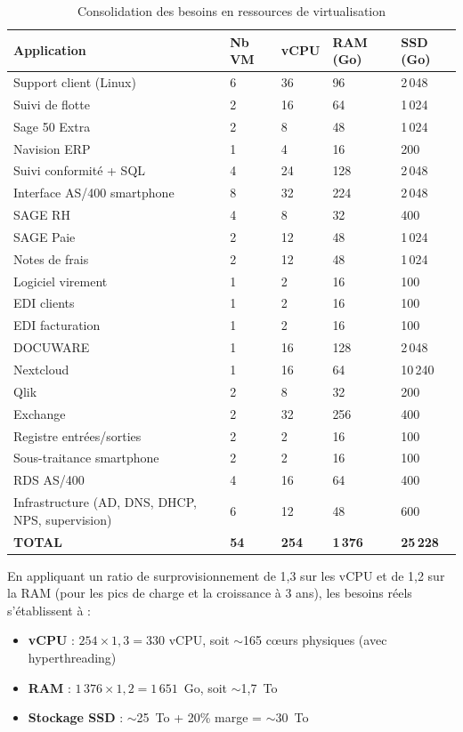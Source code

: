 \documentclass[12pt,a4paper]{report}
\begin{document}
\begin{table}[H]
\centering
\small
\begin{tabularx}{\textwidth}{L{4.5cm}C{1.5cm}R{1.5cm}R{1.8cm}R{1.8cm}}
\toprule
\textbf{Application} & \textbf{Nb VM} & \textbf{vCPU} & \textbf{RAM (Go)} & \textbf{SSD (Go)} \\
\midrule
Support client (Linux) & 6 & 36 & 96 & 2\,048 \\
Suivi de flotte & 2 & 16 & 64 & 1\,024 \\
Sage 50 Extra & 2 & 8 & 48 & 1\,024 \\
Navision ERP & 1 & 4 & 16 & 200 \\
Suivi conformité + SQL & 4 & 24 & 128 & 2\,048 \\
Interface AS/400 smartphone & 8 & 32 & 224 & 2\,048 \\
SAGE RH & 4 & 8 & 32 & 400 \\
SAGE Paie & 2 & 12 & 48 & 1\,024 \\
Notes de frais & 2 & 12 & 48 & 1\,024 \\
Logiciel virement & 1 & 2 & 16 & 100 \\
EDI clients & 1 & 2 & 16 & 100 \\
EDI facturation & 1 & 2 & 16 & 100 \\
DOCUWARE & 1 & 16 & 128 & 2\,048 \\
Nextcloud & 1 & 16 & 64 & 10\,240 \\
Qlik & 2 & 8 & 32 & 200 \\
Exchange & 2 & 32 & 256 & 400 \\
Registre entrées/sorties & 2 & 2 & 16 & 100 \\
Sous-traitance smartphone & 2 & 2 & 16 & 100 \\
RDS AS/400 & 4 & 16 & 64 & 400 \\
Infrastructure (AD, DNS, DHCP, NPS, supervision) & 6 & 12 & 48 & 600 \\
\midrule
\textbf{TOTAL} & \textbf{54} & \textbf{254} & \textbf{1\,376} & \textbf{25\,228} \\
\bottomrule
\end{tabularx}
\caption{Consolidation des besoins en ressources de virtualisation}
\label{tab:vm_sizing}
\end{table}

En appliquant un ratio de surprovisionnement de 1,3 sur les vCPU et de 1,2 sur la RAM (pour les pics de charge et la croissance à 3 ans), les besoins réels s'établissent à :

\begin{itemize}
\item \textbf{vCPU} : $254 \times 1{,}3 = 330$ vCPU, soit $\sim$165 c\oe urs physiques (avec hyperthreading)
\item \textbf{RAM} : $1\,376 \times 1{,}2 = 1\,651$~Go, soit $\sim$1,7~To
\item \textbf{Stockage SSD} : $\sim$25~To + 20\% marge = $\sim$30~To
\end{itemize}
\end{document}

